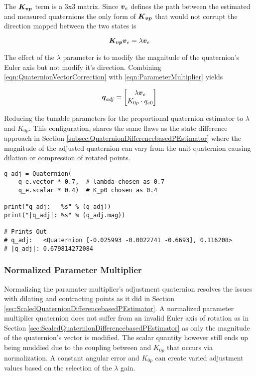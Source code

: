 The $\boldsymbol{K_{vp}}$ term is a 3x3 matrix.  Since $\boldsymbol{v}_e$ defines the path between the estimated and measured quaternions the only form of $\boldsymbol{K_{vp}}$ that would not corrupt the direction mapped between the two states is

\begin{equation}
  \boldsymbol{K_{vp}} \boldsymbol{v}_e = \lambda \boldsymbol{v}_e
  \label{eqn:QuaternionVectorCorrection}
\end{equation}

The effect of the $\lambda$ parameter is to modify the magnitude of the quaternion's Euler axis but not modify it's direction.  Combining \ref{eqn:QuaternionVectorCorrection} with \ref{eqn:ParameterMultiplier} yields

\begin{equation}
  \boldsymbol{q}_{adj} = \begin{bmatrix} \lambda \boldsymbol{v}_e \\ K_{0p} \cdot q_{e0} \end{bmatrix}
  \label{eqn:QuaternionScalarMultiplier}
\end{equation}

Reducing the tunable parameters for the proportional quaternion estimator to $\lambda$ and $K_{0p}$.  This configuration, shares the same flaws as the state difference approach in Section \ref{subsec:QuaternionDifferencebasedPEstimator} where the magnitude of the adjusted quaternion can vary from the unit quaternion causing dilation or compression of rotated points.

\begin{singlespace}
  \begin{verbatim}
q_adj = Quaternion(
    q_e.vector * 0.7,  # lambda chosen as 0.7
    q_e.scalar * 0.4)  # K_p0 chosen as 0.4

print("q_adj:   %s" % (q_adj))
print("|q_adj|: %s" % (q_adj.mag))

# Prints Out
# q_adj:   <Quaternion [-0.025993 -0.0022741 -0.6693], 0.116208>
# |q_adj|: 0.679814272084
  \end{verbatim}
\nocite{minted}
\end{singlespace}


\subsubsection{Normalized Parameter Multiplier}
\label{subsubsec:NormalizedParameterMultiplier}

Normalizing the paramater multiplier's adjustment quaternion resolves the issues with dilating and contracting points as it did in Section \ref{sec:ScaledQuaternionDifferencebasedPEstimator}.  A normalized parameter multiplier quaternion does not suffer from an invalid Euler axis of rotation as in Section \ref{sec:ScaledQuaternionDifferencebasedPEstimator} as only the magnitude of the quaternion's vector is modified.  The scalar quantity however still ends up being muddied due to the coupling between  and $K_{0p}$ that occurs via normalization.  A constant angular error and $K_{0p}$ can create varied adjustment values based on the selection of the $\lambda$ gain.

